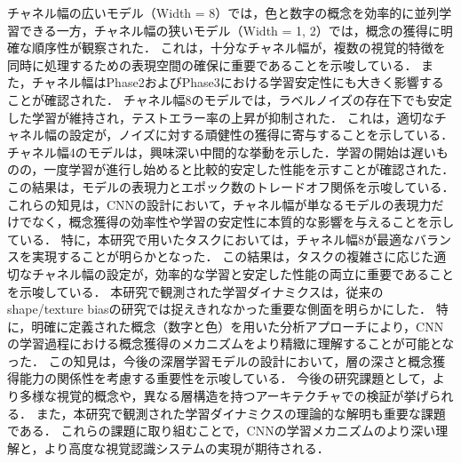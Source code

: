 チャネル幅の広いモデル（Width = 8）では，色と数字の概念を効率的に並列学習できる一方，チャネル幅の狭いモデル（Width = 1, 2）では，概念の獲得に明確な順序性が観察された．
これは，十分なチャネル幅が，複数の視覚的特徴を同時に処理するための表現空間の確保に重要であることを示唆している．
また，チャネル幅はPhase2およびPhase3における学習安定性にも大きく影響することが確認された．
チャネル幅8のモデルでは，ラベルノイズの存在下でも安定した学習が維持され，テストエラー率の上昇が抑制された．
これは，適切なチャネル幅の設定が，ノイズに対する頑健性の獲得に寄与することを示している．
チャネル幅4のモデルは，興味深い中間的な挙動を示した．学習の開始は遅いものの，一度学習が進行し始めると比較的安定した性能を示すことが確認された．
この結果は，モデルの表現力とエポック数のトレードオフ関係を示唆している．
これらの知見は，CNNの設計において，チャネル幅が単なるモデルの表現力だけでなく，概念獲得の効率性や学習の安定性に本質的な影響を与えることを示している．
特に，本研究で用いたタスクにおいては，チャネル幅8が最適なバランスを実現することが明らかとなった．
この結果は，タスクの複雑さに応じた適切なチャネル幅の設定が，効率的な学習と安定した性能の両立に重要であることを示唆している．
本研究で観測された学習ダイナミクスは，従来のshape/texture biasの研究では捉えきれなかった重要な側面を明らかにした．
特に，明確に定義された概念（数字と色）を用いた分析アプローチにより，CNNの学習過程における概念獲得のメカニズムをより精緻に理解することが可能となった．
この知見は，今後の深層学習モデルの設計において，層の深さと概念獲得能力の関係性を考慮する重要性を示唆している．
今後の研究課題として，より多様な視覚的概念や，異なる層構造を持つアーキテクチャでの検証が挙げられる．
また，本研究で観測された学習ダイナミクスの理論的な解明も重要な課題である．
これらの課題に取り組むことで，CNNの学習メカニズムのより深い理解と，より高度な視覚認識システムの実現が期待される．
